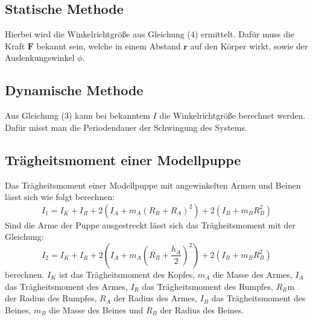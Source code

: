 \subsection{Statische Methode}
Hierbei wird die Winkelrichtgröße aus Gleichung (4) ermittelt. Dafür muss die
Kraft $\symbf{F}$ bekannt sein, welche in einem Abstand $\symbf{r}$ auf den Körper wirkt,
sowie der Auslenkungswinkel $\phi$.
\subsection{Dynamische Methode}
Aus Gleichung (3) kann bei bekanntem $I$ die Winkelrichtgröße berechnet werden. Dafür
misst man die Periodendauer der Schwingung des Systems.

\subsection{Trägheitsmoment einer Modellpuppe}
Das Trägheitsmoment einer Modellpuppe mit angewinkelten Armen und Beinen lässt sich
wie folgt berechnen:
\begin{equation}
  I_1 = I_K + I_R + 2(I_A + m_A(R_R + R_A)^2) + 2(I_B + m_B R_B^2)
\end{equation}
Sind die Arme der Puppe ausgestreckt lässt sich das Trägheitsmoment mit der
Gleichung:
\begin{equation}
  I_2 = I_K + I_R + 2(I_A + m_A(R_R + \frac{h_A}{2})^2) + 2(I_B + m_B R_B^2)
\end{equation}
berechnen.
$I_K$ ist das Trägheitsmoment des Kopfes,
$m_A$ die Masse des Armes,
$I_A$  das Trägheitsmoment des Armes, $I_R$ das Trägheitsmoment des Rumpfes,
$R_R$m der Radius des Rumpfes, $R_A$ der Radius des Armes, $I_B$ das Trägheitsmoment des Beines,
$m_B$ die Masse des Beines und $R_B$ der Radius des Beines.
